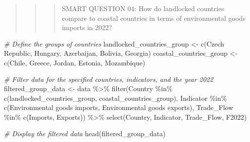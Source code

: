 \documentclass[
]{article}
\newenvironment{Shaded}{\begin{snugshade}}{\end{snugshade}}
\newcommand{\CommentTok}[1]{\textcolor[rgb]{0.56,0.35,0.01}{\textit{#1}}}
\newcommand{\FunctionTok}[1]{\textcolor[rgb]{0.00,0.00,0.00}{#1}}
\newcommand{\NormalTok}[1]{#1}
\newcommand{\OtherTok}[1]{\textcolor[rgb]{0.56,0.35,0.01}{#1}}
\newcommand{\SpecialCharTok}[1]{\textcolor[rgb]{0.00,0.00,0.00}{#1}}
\newcommand{\StringTok}[1]{\textcolor[rgb]{0.31,0.60,0.02}{#1}}
\begin{document}
\begin{quote}
\begin{quote}
\begin{quote}
SMART QUESTION 04: How do landlocked countries compare to coastal
countries in terms of environmental goods imports in 2022?
\end{quote}
\end{quote}
\end{quote}

\begin{Shaded}
\begin{Highlighting}[]
\CommentTok{\# Define the groups of countries}
\NormalTok{landlocked\_countries\_group }\OtherTok{\textless{}{-}} \FunctionTok{c}\NormalTok{(}\StringTok{\textquotesingle{}Czech Republic\textquotesingle{}}\NormalTok{, }\StringTok{\textquotesingle{}Hungary\textquotesingle{}}\NormalTok{, }\StringTok{\textquotesingle{}Azerbaijan\textquotesingle{}}\NormalTok{, }\StringTok{\textquotesingle{}Bolivia\textquotesingle{}}\NormalTok{, }\StringTok{\textquotesingle{}Georgia\textquotesingle{}}\NormalTok{)}
\NormalTok{coastal\_countries\_group }\OtherTok{\textless{}{-}} \FunctionTok{c}\NormalTok{(}\StringTok{\textquotesingle{}Chile\textquotesingle{}}\NormalTok{, }\StringTok{\textquotesingle{}Greece\textquotesingle{}}\NormalTok{, }\StringTok{\textquotesingle{}Jordan\textquotesingle{}}\NormalTok{, }\StringTok{\textquotesingle{}Estonia\textquotesingle{}}\NormalTok{, }\StringTok{\textquotesingle{}Mozambique\textquotesingle{}}\NormalTok{)}

\CommentTok{\# Filter data for the specified countries, indicators, and the year 2022}
\NormalTok{filtered\_group\_data }\OtherTok{\textless{}{-}}\NormalTok{ data }\SpecialCharTok{\%\textgreater{}\%}
  \FunctionTok{filter}\NormalTok{(Country }\SpecialCharTok{\%in\%} \FunctionTok{c}\NormalTok{(landlocked\_countries\_group, coastal\_countries\_group),}
\NormalTok{         Indicator }\SpecialCharTok{\%in\%} \FunctionTok{c}\NormalTok{(}\StringTok{\textquotesingle{}Environmental goods imports\textquotesingle{}}\NormalTok{, }\StringTok{\textquotesingle{}Environmental goods exports\textquotesingle{}}\NormalTok{),}
\NormalTok{         Trade\_Flow }\SpecialCharTok{\%in\%} \FunctionTok{c}\NormalTok{(}\StringTok{\textquotesingle{}Imports\textquotesingle{}}\NormalTok{, }\StringTok{\textquotesingle{}Exports\textquotesingle{}}\NormalTok{)) }\SpecialCharTok{\%\textgreater{}\%}
  \FunctionTok{select}\NormalTok{(Country, Indicator, Trade\_Flow, F2022)}

\CommentTok{\# Display the filtered data}
\FunctionTok{head}\NormalTok{(filtered\_group\_data)}
\end{Highlighting}
\end{Shaded}
\end{document}
